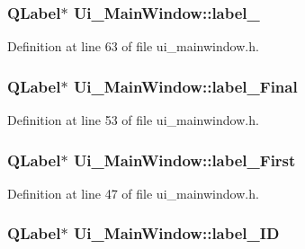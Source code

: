 \subsubsection[{label\+\_\+6}]{\setlength{\rightskip}{0pt plus 5cm}Q\+Label$\ast$ Ui\+\_\+\+Main\+Window\+::label\+\_}\label{class_ui___main_window_a663f728e6244926a795c6e6892673b1d}


Definition at line 63 of file ui\+\_\+mainwindow.\+h.

\hypertarget{class_ui___main_window_a5a5a49163b5063282ddaf88d2355c30e}{}
\subsubsection[{label\+\_\+\+Final}]{\setlength{\rightskip}{0pt plus 5cm}Q\+Label$\ast$ Ui\+\_\+\+Main\+Window\+::label\+\_\+\+Final}\label{class_ui___main_window_a5a5a49163b5063282ddaf88d2355c30e}


Definition at line 53 of file ui\+\_\+mainwindow.\+h.

\hypertarget{class_ui___main_window_a6fd163a42ddade5bc9b5bb3383cc7777}{}
\subsubsection[{label\+\_\+\+First}]{\setlength{\rightskip}{0pt plus 5cm}Q\+Label$\ast$ Ui\+\_\+\+Main\+Window\+::label\+\_\+\+First}\label{class_ui___main_window_a6fd163a42ddade5bc9b5bb3383cc7777}


Definition at line 47 of file ui\+\_\+mainwindow.\+h.

\hypertarget{class_ui___main_window_a8f2f0b11f2f28973d92a1da7b3c1a2fa}{}
\subsubsection[{label\+\_\+\+I\+D}]{\setlength{\rightskip}{0pt plus 5cm}Q\+Label$\ast$ Ui\+\_\+\+Main\+Window\+::label\+\_\+\+I\+D}\label{class_ui___main_window_a8f2f0b11f2f28973d92a1da7b3c1a2fa}


